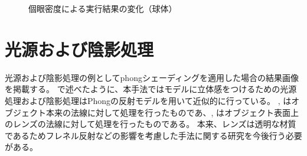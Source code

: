 \begin{figure}[htbp]
{\label{FReso100Sphere}}
  \caption{個眼密度による実行結果の変化（球体）}
  \label{FResoSphere}
\end{figure}

\section{光源および陰影処理}
\label{SPhongResult}

光源および陰影処理の例としてphongシェーディングを適用した場合の結果画像を掲載する。
で述べたように、本手法ではモデルに立体感をつけるための光源処理および陰影処理はPhongの反射モデルを用いて近似的に行っている。
, はオブジェクト本来の法線に対して処理を行ったものであ、, はオブジェクト表面上のレンズの法線に対して処理を行ったものである。
本来、レンズは透明な材質であるためフレネル反射などの影響を考慮した手法に関する研究を今後行う必要がある。

